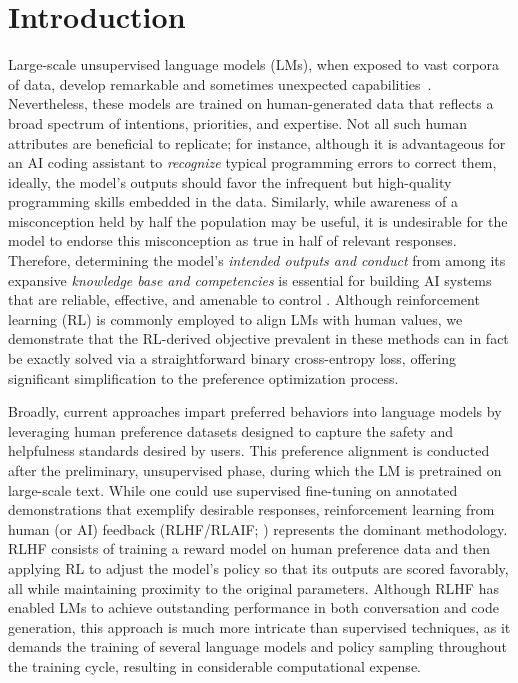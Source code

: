 \section{Introduction}
Large-scale unsupervised language models (LMs), when exposed to vast corpora of data, develop remarkable and sometimes unexpected capabilities~\citep{chowdhery2022palm, brown2020language, touvron2023llama,bubeck2023sparks}. Nevertheless, these models are trained on human-generated data that reflects a broad spectrum of intentions, priorities, and expertise. Not all such human attributes are beneficial to replicate; for instance, although it is advantageous for an AI coding assistant to \textit{recognize} typical programming errors to correct them, ideally, the model’s outputs should favor the infrequent but high-quality programming skills embedded in the data. Similarly, while awareness of a misconception held by half the population may be useful, it is undesirable for the model to endorse this misconception as true in half of relevant responses. Therefore, determining the model's \emph{intended outputs and conduct} from among its expansive \textit{knowledge base and competencies} is essential for building AI systems that are reliable, effective, and amenable to control \citep{ouyang2022training}. Although reinforcement learning (RL) is commonly employed to align LMs with human values, we demonstrate that the RL-derived objective prevalent in these methods can in fact be exactly solved via a straightforward binary cross-entropy loss, offering significant simplification to the preference optimization process.

Broadly, current approaches impart preferred behaviors into language models by leveraging human preference datasets designed to capture the safety and helpfulness standards desired by users. This preference alignment is conducted after the preliminary, unsupervised phase, during which the LM is pretrained on large-scale text. While one could use supervised fine-tuning on annotated demonstrations that exemplify desirable responses, reinforcement learning from human (or AI) feedback (RLHF/RLAIF; \citep{christiano2017deep,bai2022constitutional}) represents the dominant methodology. RLHF consists of training a reward model on human preference data and then applying RL to adjust the model’s policy so that its outputs are scored favorably, all while maintaining proximity to the original parameters. Although RLHF has enabled LMs to achieve outstanding performance in both conversation and code generation, this approach is much more intricate than supervised techniques, as it demands the training of several language models and policy sampling throughout the training cycle, resulting in considerable computational expense.

